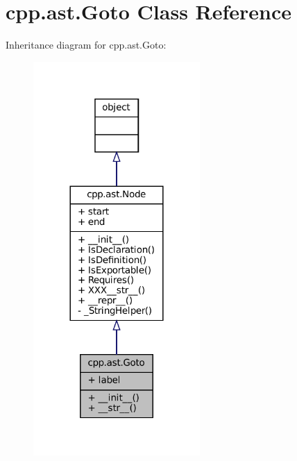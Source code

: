 \hypertarget{classcpp_1_1ast_1_1Goto}{}\section{cpp.\+ast.\+Goto Class Reference}
\label{classcpp_1_1ast_1_1Goto}


Inheritance diagram for cpp.\+ast.\+Goto\+:
\nopagebreak
\begin{figure}[H]
\begin{center}
\leavevmode
\includegraphics[width=180pt]{classcpp_1_1ast_1_1Goto__inherit__graph}
\end{center}
\end{figure}


